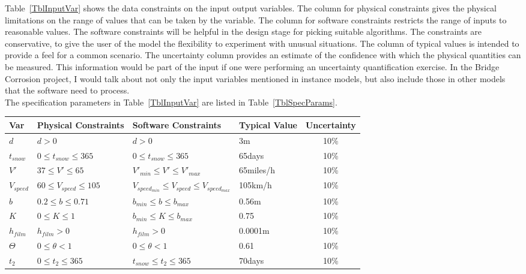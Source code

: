 \documentclass[12pt]{article}
\begin{document}
Table~\ref{TblInputVar} shows the data constraints on the input output
variables.  The column for physical constraints gives the physical limitations
on the range of values that can be taken by the variable.  The column for
software constraints restricts the range of inputs to reasonable values.  The
software constraints will be helpful in the design stage for picking suitable
algorithms.  The constraints are conservative, to give the user of the model the
flexibility to experiment with unusual situations.  The column of typical values
is intended to provide a feel for a common scenario.  The uncertainty column
provides an estimate of the confidence with which the physical quantities can be
measured.  This information would be part of the input if one were performing an
uncertainty quantification exercise. In the Bridge Corrosion project, I would talk about not only the input variables mentioned in instance models, but also include those in other models that the software need to process.\\
The specification parameters in Table~\ref{TblInputVar} are listed in
Table~\ref{TblSpecParams}.

\begin{table}[!h]
  \caption{Input Variables} \label{TblInputVar}
  \renewcommand{\arraystretch}{1.2}
\noindent \begin{longtable*}{l l l l c} 
  \toprule
  \textbf{Var} & \textbf{Physical Constraints} & \textbf{Software Constraints} &
                             \textbf{Typical Value} & \textbf{Uncertainty}\\
  \midrule 
  $d$ & $d > 0$ & $d>0$ & 3m & 10\%
  \\
  $t_{snow}$ & $0 \leq t_{snow} \leq 365$ & $0 \leq t_{snow} \leq 365$ & 65days & 10\%
  \\
  $V'$ & $37 \leq V' \leq 65$ & $V'_{min}\leq V' \leq V'_{max}$ & 65miles/h & 10\%
  \\
  $V_{speed}$ & $60 \leq V_{speed} \leq 105$ & $V_{speed_{min}} \leq V_{speed} \leq V_{speed_{max}}$ & 105km/h & 10\%
  \\
  $b$ & $0.2 \leq b \leq 0.71$ & $b_{min} \leq b \leq b_{max}$ & 0.56m & 10\%
  \\
  $K$ & $0 \leq K \leq 1$ & $b_{min} \leq K \leq b_{max}$ & 0.75 & 10\%
  \\
  $h_{film}$ & $h_{film} > 0$ & $h_{film} > 0$ & 0.0001m & 10\%
  \\
  $\Theta$ & $0 \leq \theta < 1$ & $0 \leq \theta < 1$ & 0.61 & 10\%
  \\
  $t_2$ & $0 \leq t_2 \leq 365$ & $t_{snow} \leq t_2 \leq 365$ & 70days & 10\%
  \\
  \bottomrule
\end{longtable*}
\end{table}
\end{document}
